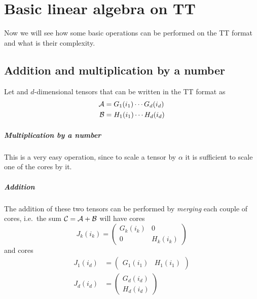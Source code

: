 \chapter{Basic linear algebra on TT}
Now we will see how some basic operations can be performed on the TT format and what is their complexity.

\section{Addition and multiplication by a number}
Let \A and \B $d$-dimensional tensors that can be written in the TT format as
\begin{equation*}
  \begin{split}
    \mathcal{A} &= G_1(i_1) \cdots G_d(i_d)\\
    \mathcal{B} &= H_1(i_1) \cdots H_d(i_d)
  \end{split}
\end{equation*}

\paragraph{Multiplication by a number}
This is a very easy operation, since to scale a tensor by $\alpha$ it is sufficient to scale one of the cores by it.

\paragraph{Addition}
The addition of these two tensors can be performed by \emph{merging} each couple of cores, i.e.\ the sum $\mathcal{C} = \mathcal{A} + \mathcal{B}$ will have  cores
\begin{equation*}
  J_k(i_k) = 
  \begin{pmatrix}
    G_k(i_k) & 0\\
    0 & H_k(i_k)
  \end{pmatrix}
\end{equation*}
and  cores
\begin{equation*}
  \begin{split}
    J_1(i_d) &= 
  \begin{pmatrix}
    G_1(i_1) & H_1(i_1)
  \end{pmatrix}\\
  J_d(i_d) &= 
  \begin{pmatrix}
    G_d(i_d)\\
    H_d(i_d)
  \end{pmatrix}
  \end{split}
\end{equation*}

